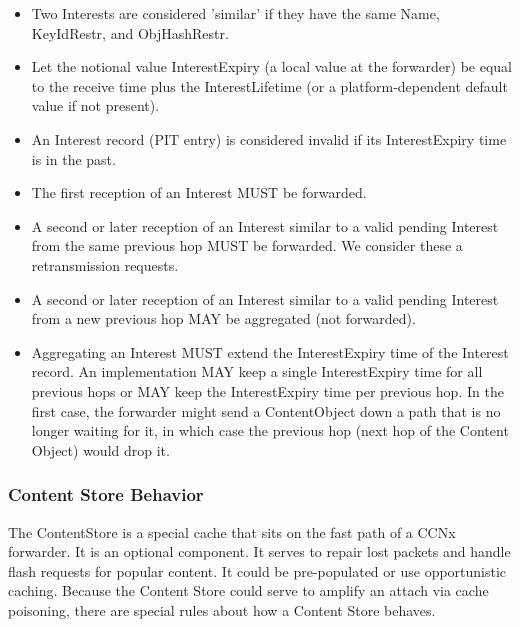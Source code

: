 \documentclass[12pt]{report}
\begin{document}
\begin{itemize}

\item Two Interests are considered 'similar' if they have the same Name,
   KeyIdRestr, and ObjHashRestr.

\item Let the notional value InterestExpiry (a local value at the
   forwarder) be equal to the receive time plus the InterestLifetime
   (or a platform-dependent default value if not present).

\item An Interest record (PIT entry) is considered invalid if its
   InterestExpiry time is in the past.

\item The first reception of an Interest MUST be forwarded.

\item A second or later reception of an Interest similar to a valid
   pending Interest from the same previous hop MUST be forwarded.  We
   consider these a retransmission requests.

\item A second or later reception of an Interest similar to a valid
   pending Interest from a new previous hop MAY be aggregated (not
   forwarded).

\item Aggregating an Interest MUST extend the InterestExpiry time of the
    Interest record.  An implementation MAY keep a single
    InterestExpiry time for all previous hops or MAY keep the
    InterestExpiry time per previous hop.  In the first case, the
    forwarder might send a ContentObject down a path that is no longer
    waiting for it, in which case the previous hop (next hop of the
    Content Object) would drop it.
\end{itemize}

\subsubsection{Content Store Behavior}
The ContentStore is a special cache that sits on the fast path of a
CCNx forwarder.  It is an optional component.  It serves to repair
lost packets and handle flash requests for popular content.  It could
be pre-populated or use opportunistic caching.  Because the Content
Store could serve to amplify an attach via cache poisoning, there are
special rules about how a Content Store behaves.
\end{document}
